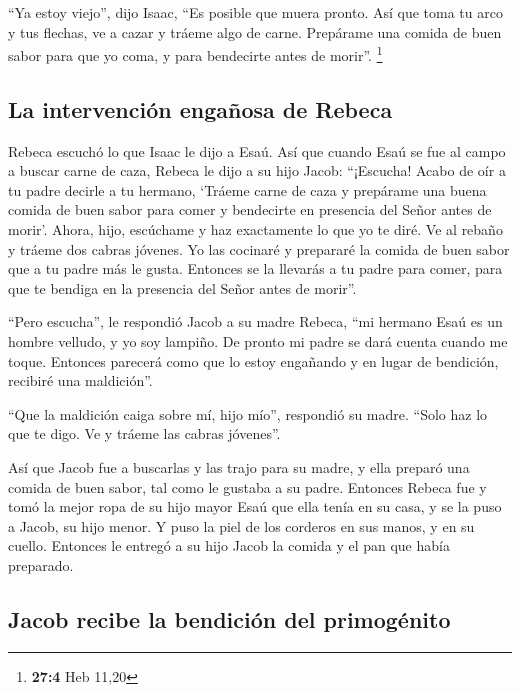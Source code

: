  ``Ya estoy viejo'', dijo Isaac, ``Es posible que muera
pronto.  Así que toma tu arco y tus flechas, ve a cazar y
tráeme algo de carne.  Prepárame una comida de buen sabor
para que yo coma, y para bendecirte antes de morir''. \footnote{\textbf{27:4}
  Heb 11,20}

\hypertarget{la-intervenciuxf3n-engauxf1osa-de-rebeca}{%
\subsection{La intervención engañosa de
Rebeca}\label{la-intervenciuxf3n-engauxf1osa-de-rebeca}}

 Rebeca escuchó lo que Isaac le dijo a Esaú. Así que
cuando Esaú se fue al campo a buscar carne de caza, 
Rebeca le dijo a su hijo Jacob: ``¡Escucha! Acabo de oír a tu padre
decirle a tu hermano,  `Tráeme carne de caza y prepárame
una buena comida de buen sabor para comer y bendecirte en presencia del
Señor antes de morir'.  Ahora, hijo, escúchame y haz
exactamente lo que yo te diré.  Ve al rebaño y tráeme dos
cabras jóvenes. Yo las cocinaré y prepararé la comida de buen sabor que
a tu padre más le gusta.  Entonces se la llevarás a tu
padre para comer, para que te bendiga en la presencia del Señor antes de
morir''.

 ``Pero escucha'', le respondió Jacob a su madre Rebeca,
``mi hermano Esaú es un hombre velludo, y yo soy lampiño.
 De pronto mi padre se dará cuenta cuando me toque.
Entonces parecerá como que lo estoy engañando y en lugar de bendición,
recibiré una maldición''.

 ``Que la maldición caiga sobre mí, hijo mío'', respondió
su madre. ``Solo haz lo que te digo. Ve y tráeme las cabras jóvenes''.

 Así que Jacob fue a buscarlas y las trajo para su madre,
y ella preparó una comida de buen sabor, tal como le gustaba a su padre.
 Entonces Rebeca fue y tomó la mejor ropa de su hijo
mayor Esaú que ella tenía en su casa, y se la puso a Jacob, su hijo
menor.  Y puso la piel de los corderos en sus manos, y en
su cuello.  Entonces le entregó a su hijo Jacob la comida
y el pan que había preparado.

\hypertarget{jacob-recibe-la-bendiciuxf3n-del-primoguxe9nito}{%
\subsection{Jacob recibe la bendición del
primogénito}\label{jacob-recibe-la-bendiciuxf3n-del-primoguxe9nito}}


